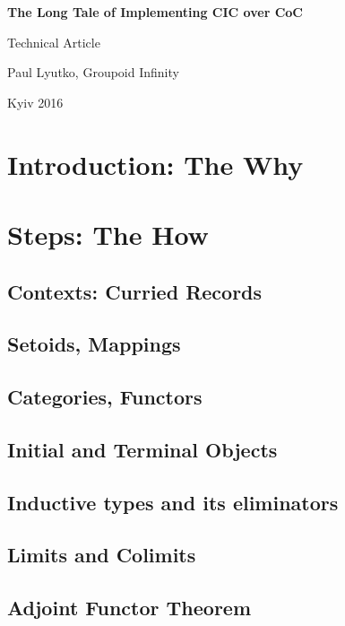 \documentclass[11pt,oneside]{article}
\begin{document}
\thispagestyle{empty}
\begin{center}
\vspace{3cm}
    \vspace{3cm}   {\Large \bf The Long Tale of Implementing CIC over CoC\\}\par
    \vspace{0.3cm} {\Large Technical Article\par}
    \vspace{0.3cm} {\Large Paul Lyutko, Groupoid Infinity\par}
    \vspace{4cm}   {\Large Kyiv 2016}
\end{center}

\newpage
\vspace{2cm}
\tableofcontents

\newpage
\section{Introduction: The Why}

\section{Steps: The How}
\subsection{Contexts: Curried Records}
\subsection{Setoids, Mappings}
\subsection{Categories, Functors}
\subsection{Initial and Terminal Objects}
\subsection{Inductive types and its eliminators}
\subsection{Limits and Colimits}
\subsection{Adjoint Functor Theorem}
\end{document}
